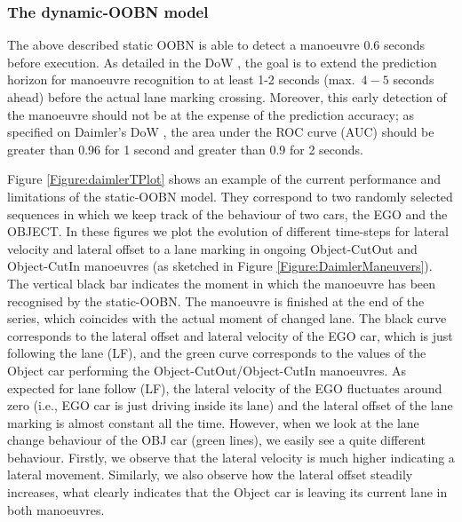 \subsubsection*{The dynamic-OOBN model}

The above described static OOBN is able to detect a manoeuvre $0.6$ seconds before execution. As detailed in the DoW \cite{Fer14}, the goal is to extend the prediction horizon for manoeuvre recognition to at least 1-2 seconds (max.\ $4-5$ seconds ahead) before the actual lane marking crossing. Moreover, this early detection of the manoeuvre should not be at the expense of the prediction accuracy;  as specified on Daimler's DoW \cite{Fer14}, the area under the ROC curve (AUC) should be greater than 0.96 for 1 second and greater than 0.9 for 2 seconds.

Figure \ref{Figure:daimlerTPlot} shows an example of the current performance and limitations of the static-OOBN model. They correspond to two randomly selected sequences in which we keep track of the behaviour of two cars, the EGO and the OBJECT. In these figures we plot the evolution of different time-steps for lateral velocity and lateral offset to a lane marking in ongoing Object-CutOut and Object-CutIn manoeuvres (as sketched in Figure \ref{Figure:DaimlerManeuvers}). The vertical black bar indicates the moment in which the manoeuvre has been recognised by the static-OOBN. The manoeuvre is finished at the end of the series, which coincides with the actual moment of changed lane. The black curve corresponds to the lateral offset and lateral velocity of the EGO car, which is just following the lane (LF), and the green curve corresponds to the values of the Object car performing the Object-CutOut/Object-CutIn manoeuvres. As expected for lane follow (LF), the lateral velocity of the EGO fluctuates around zero  (i.e., EGO car is just driving inside its lane) and the lateral offset of the lane marking is almost constant all the time. However, when we look at the lane change behaviour of the OBJ car (green lines), we easily see a quite different behaviour. Firstly, we observe that the lateral velocity is much  higher indicating a lateral movement. Similarly, we also observe how the lateral offset steadily increases, what clearly indicates that the Object car is leaving its current lane in both manoeuvres. 

